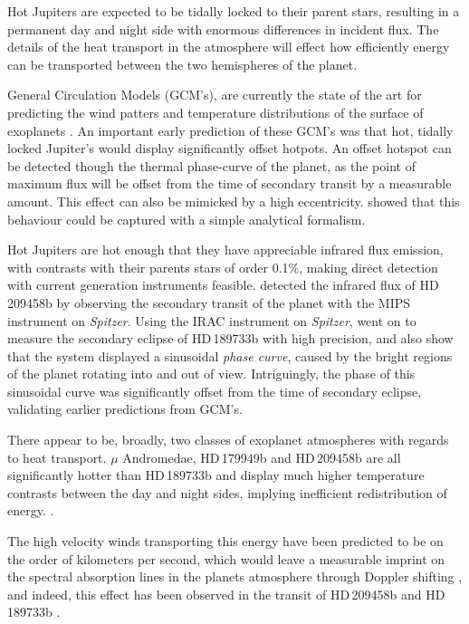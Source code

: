 \documentclass[a4paper,fleqn,usenatbib]{mnras}
\begin{document}
Hot Jupiters are expected to be tidally locked to their parent stars, resulting in a permanent day and night side with enormous differences in incident flux. The details of the heat transport in the atmosphere will effect how efficiently energy can be transported between the two hemispheres of the planet.

General Circulation Models (GCM's), are currently the state of the art for predicting the wind patters and temperature distributions of the surface of exoplanets \citep[e.g.][]{Showman2008}. An important early prediction of these GCM's was that hot, tidally locked Jupiter's would display significantly offset hotpots. An offset hotspot can be detected though the thermal phase-curve of the planet, as the point of maximum flux will be offset from the time of secondary transit by a measurable amount. This effect can also be mimicked by a high eccentricity. \citet{Zhang2016} showed that this behaviour could be captured with a simple analytical formalism.

Hot Jupiters are hot enough that they have appreciable infrared flux emission, with contrasts with their parents stars of order 0.1\%, making direct detection with current generation instruments feasible. \citet{Deming2005} detected the infrared flux of HD\,209458b by observing the secondary transit of the planet with the MIPS instrument on \emph{Spitzer}. Using the IRAC instrument on \emph{Spitzer}, \citet{Knutson2007b} went on to measure the secondary eclipse of HD\,189733b with high precision, and also show that the system displayed a sinusoidal \emph{phase curve}, caused by the bright regions of the planet rotating into and out of view. Intriguingly, the phase of this sinusoidal curve was significantly offset from the time of secondary eclipse, validating earlier predictions from GCM's.

There appear to be, broadly, two classes of exoplanet atmospheres with regards to heat transport. $\mu$ Andromedae, HD\,179949b and HD\,209458b are all significantly hotter than HD\,189733b and display much higher temperature contrasts between the day and night sides, implying inefficient redistribution of energy. \citep{Harrington2006,Cowan2007,zellem2014}. 

The high velocity winds transporting this energy have been predicted to be on the order of kilometers per second, which would leave a measurable imprint on the spectral absorption lines in the planets atmosphere through Doppler shifting \citep[e.g.][]{Showman2013}, and indeed, this effect has been observed in the transit of HD\,209458b \citep{Snellen2010} and HD\,189733b \citep{Louden2015}. 
\end{document}
